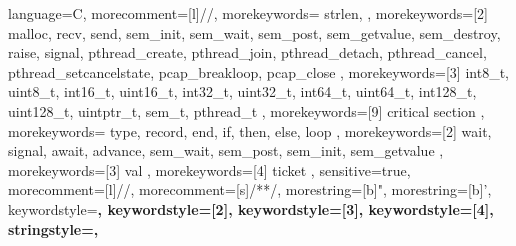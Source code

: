 %
{%
	language=C,%
	morecomment=[l]{//},%
	morekeywords={%
		strlen,
	},%
	morekeywords=[2]{%
		malloc,
		recv,
		send,
		sem_init,
		sem_wait,
		sem_post,
		sem_getvalue,
		sem_destroy,
		raise,
		signal,
		pthread_create,
		pthread_join,
		pthread_detach,
		pthread_cancel,
		pthread_setcancelstate,
		pcap_breakloop,
		pcap_close
	},%
	morekeywords=[3]{%
		int8_t,
		uint8_t,
		int16_t,
		uint16_t,
		int32_t,
		uint32_t,
		int64_t,
		uint64_t,
		int128_t,
		uint128_t,
		uintptr_t,
		sem_t,
		pthread_t
	},%
	morekeywords=[9]{%
		critical section
	},%
}%
%
{%
	morekeywords={%
		type,
		record,
		end,
		if,
		then,
		else,
		loop
	},%
	morekeywords=[2]{%
		wait,
		signal,
		await,
		advance,
		sem_wait,
		sem_post,
		sem_init,
		sem_getvalue
	},%
	morekeywords=[3]{%
		val
	},%
	morekeywords=[4]{%
		ticket
	},%
	sensitive=true,%
	morecomment=[l]{//},%
	morecomment=[s]{/*}{*/},%
	morestring=[b]",%
	morestring=[b]',%
	keywordstyle=\bfseries\ttfamily\color{blue},%
	keywordstyle=[2]\bfseries\ttfamily\color{teal},%
	keywordstyle=[3]\bfseries\ttfamily\color{olive},%
	keywordstyle=[4]\bfseries\ttfamily\color{olive},%
	stringstyle=\color{green}\ttfamily,%
}%
%
%
%
%
%
%
%
%
%
%
